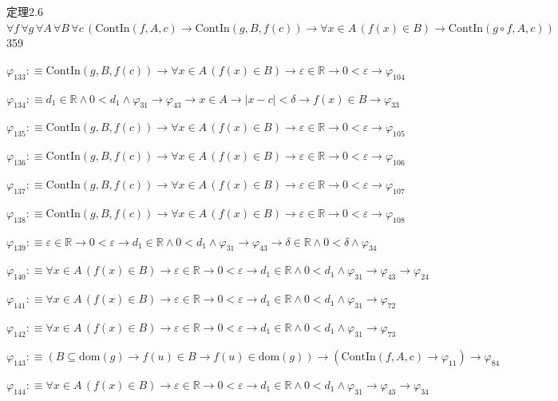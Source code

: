 \begin{fullproof}{定理2.6}{$\forall f\,\forall g\,\forall A\,\forall B\,\forall c\,(\mathrm{ContIn}(f,A,c) \to \mathrm{ContIn}(g,B,f(c)) \to \forall x \in A\,(f(x) \in B) \to \mathrm{ContIn}(g \circ f,A,c))$}{359}
\begin{abbrevlist}
\item $\varphi_{133} :\equiv \mathrm{ContIn}(g,B,f(c)) \to \forall x \in A\,(f(x) \in B) \to \varepsilon \in \mathbb{R} \to 0 < \varepsilon \to \varphi_{104}$
\item $\varphi_{134} :\equiv d_{1} \in \mathbb{R} \land 0 < d_{1} \land \varphi_{31} \to \varphi_{43} \to x \in A \to \lvert x - c \rvert < \delta \to f(x) \in B \to \varphi_{33}$
\item $\varphi_{135} :\equiv \mathrm{ContIn}(g,B,f(c)) \to \forall x \in A\,(f(x) \in B) \to \varepsilon \in \mathbb{R} \to 0 < \varepsilon \to \varphi_{105}$
\item $\varphi_{136} :\equiv \mathrm{ContIn}(g,B,f(c)) \to \forall x \in A\,(f(x) \in B) \to \varepsilon \in \mathbb{R} \to 0 < \varepsilon \to \varphi_{106}$
\item $\varphi_{137} :\equiv \mathrm{ContIn}(g,B,f(c)) \to \forall x \in A\,(f(x) \in B) \to \varepsilon \in \mathbb{R} \to 0 < \varepsilon \to \varphi_{107}$
\item $\varphi_{138} :\equiv \mathrm{ContIn}(g,B,f(c)) \to \forall x \in A\,(f(x) \in B) \to \varepsilon \in \mathbb{R} \to 0 < \varepsilon \to \varphi_{108}$
\item $\varphi_{139} :\equiv \varepsilon \in \mathbb{R} \to 0 < \varepsilon \to d_{1} \in \mathbb{R} \land 0 < d_{1} \land \varphi_{31} \to \varphi_{43} \to \delta \in \mathbb{R} \land 0 < \delta \land \varphi_{34}$
\item $\varphi_{140} :\equiv \forall x \in A\,(f(x) \in B) \to \varepsilon \in \mathbb{R} \to 0 < \varepsilon \to d_{1} \in \mathbb{R} \land 0 < d_{1} \land \varphi_{31} \to \varphi_{43} \to \varphi_{24}$
\item $\varphi_{141} :\equiv \forall x \in A\,(f(x) \in B) \to \varepsilon \in \mathbb{R} \to 0 < \varepsilon \to d_{1} \in \mathbb{R} \land 0 < d_{1} \land \varphi_{31} \to \varphi_{72}$
\item $\varphi_{142} :\equiv \forall x \in A\,(f(x) \in B) \to \varepsilon \in \mathbb{R} \to 0 < \varepsilon \to d_{1} \in \mathbb{R} \land 0 < d_{1} \land \varphi_{31} \to \varphi_{73}$
\item $\varphi_{143} :\equiv (B \subseteq \mathrm{dom}(g) \to f(u) \in B \to f(u) \in \mathrm{dom}(g)) \to (\mathrm{ContIn}(f,A,c) \to \varphi_{11}) \to \varphi_{84}$
\item $\varphi_{144} :\equiv \forall x \in A\,(f(x) \in B) \to \varepsilon \in \mathbb{R} \to 0 < \varepsilon \to d_{1} \in \mathbb{R} \land 0 < d_{1} \land \varphi_{31} \to \varphi_{43} \to \varphi_{34}$

\end{abbrevlist}
\end{fullproof}
